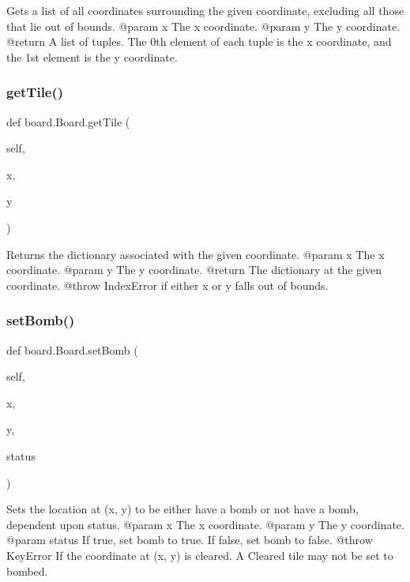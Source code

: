 \begin{DoxyVerb}Gets a list of all coordinates surrounding the given coordinate, excluding all those that lie out of bounds.
@param x The x coordinate.
@param y The y coordinate.
@return A list of tuples. The 0th element of each tuple is the x coordinate, and the 1st element is the y coordinate.
\end{DoxyVerb}
 \mbox{\label{classboard_1_1_board_afceaa19167d36a8b6a80da6647e1a3c5}} 
\subsubsection{\texorpdfstring{getTile()}{getTile()}}
{\footnotesize\ttfamily def board.\+Board.\+get\+Tile (\begin{DoxyParamCaption}\item[{}]{self,  }\item[{}]{x,  }\item[{}]{y }\end{DoxyParamCaption})}

\begin{DoxyVerb}Returns the dictionary associated with the given coordinate.
@param x The x coordinate.
@param y The y coordinate.
@return The dictionary at the given coordinate.
@throw IndexError if either x or y falls out of bounds.
\end{DoxyVerb}
 \mbox{\label{classboard_1_1_board_a44ed72c4fc9f25109c0b1fc4478c9f49}} 
\subsubsection{\texorpdfstring{setBomb()}{setBomb()}}
{\footnotesize\ttfamily def board.\+Board.\+set\+Bomb (\begin{DoxyParamCaption}\item[{}]{self,  }\item[{}]{x,  }\item[{}]{y,  }\item[{}]{status }\end{DoxyParamCaption})}

\begin{DoxyVerb}Sets the location at (x, y) to be either have a bomb or not have a bomb, dependent upon status.
@param x The x coordinate.
@param y The y coordinate.
@param status If true, set bomb to true. If false, set bomb to false.
@throw KeyError If the coordinate at (x, y) is cleared. A Cleared tile may not be set to bombed.
\end{DoxyVerb}
 \mbox{\label{classboard_1_1_board_ae82ac3a91638d8a76ad52e8ba83a60b7}} 
